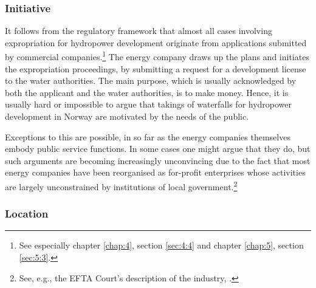 \subsubsection{Initiative}\label{sec:5:7:3}

It follows from the regulatory framework that almost all cases involving expropriation for hydropower development originate from applications submitted by commercial companies.\footnote{See especially chapter \ref{chap:4}, section \ref{sec:4:4} and chapter \ref{chap:5}, section \ref{sec:5:3}.} The energy company draws up the plans and initiates the expropriation proceedings, by submitting a request for a development license to the water authorities. The main purpose, which is usually acknowledged by both the applicant and the water authorities, is to make money. Hence, it is usually hard or impossible to argue that takings of waterfalls for hydropower development in Norway are motivated by the needs of the public. %

Exceptions to this are possible, in so far as the energy companies themselves embody public service functions. In some cases one might argue that they do, but such arguments are becoming increasingly unconvincing due to the fact that most energy companies have been reorganised as for-profit enterprises whose activities are largely unconstrained by institutions of local government.\footnote{See, e.g., the EFTA Court's description of the industry, \cite{efta07}.}

\subsubsection{Location}\label{sec:5:7:4}

